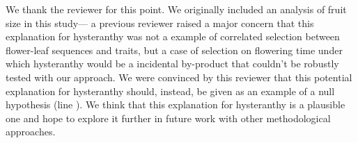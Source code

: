 \documentclass{article}[12pt]
\begin{document}
We thank the reviewer for this point. We originally included an analysis of fruit size in this study--- a previous reviewer raised a major concern that this explanation for hysteranthy was not a example of correlated selection between flower-leaf sequences and traits, but a case of selection on flowering time under which hysteranthy would be a incidental by-product that couldn't be robustly tested with our approach. We were convinced by this reviewer that this potential explanation for hysteranthy should, instead, be given as an example of a null hypothesis (line ). We think that this explanation for hysteranthy is a plausible one and hope to explore it further in future work with other methodological approaches.

 
\end{document}
